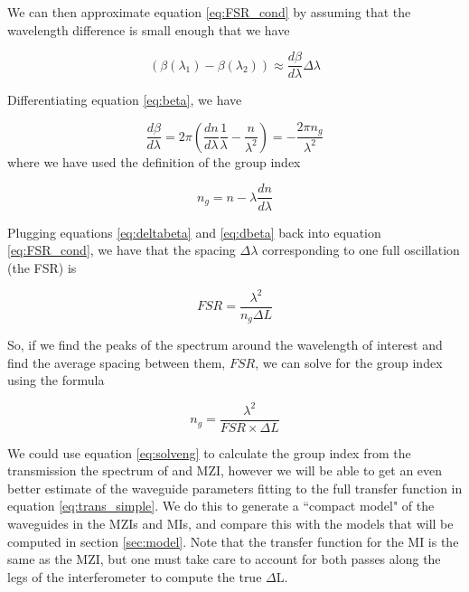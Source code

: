 \documentclass[journal]{IEEEtran}
\begin{document}
We can then approximate equation \ref{eq:FSR_cond} by assuming that the wavelength difference is small enough that we have

\begin{equation}
(\beta(\lambda_1) - \beta(\lambda_2)) \approx \frac{d\beta}{d\lambda} \Delta \lambda
\label{eq:deltabeta}
\end{equation}

Differentiating equation \ref{eq:beta}, we have

\begin{equation}
\frac{d\beta}{d\lambda} = 2\pi\left(\frac{dn}{d\lambda}\frac{1}{\lambda} - \frac{n}{\lambda^2} \right) = - \frac{2\pi  n_g}{\lambda^2}
\label{eq:dbeta}
\end{equation}
where we have used the definition of the group index 

\begin{equation}
n_g = n - \lambda \frac{dn}{d \lambda}
\label{eq:ngdef}
\end{equation}


Plugging equations \ref{eq:deltabeta} and  \ref{eq:dbeta} back into equation \ref{eq:FSR_cond}, we have that the spacing $\Delta \lambda$ corresponding to one full oscillation (the FSR) is 

\begin{equation}
FSR = \frac{\lambda^2}{n_g \Delta L}
\label{eq:FSR}
\end{equation}

So, if we find the peaks of the spectrum around the wavelength of interest and find the average spacing between them, $FSR$, we can solve for the group index using the formula

\begin{equation}
n_g = \frac{\lambda^2}{FSR \times \Delta L}
\label{eq:solveng}
\end{equation}

We could use equation \ref{eq:solveng} to calculate the group index from the transmission the spectrum of and MZI, however we will be able to get an even better estimate of the waveguide parameters fitting to the full transfer function in equation \ref{eq:trans_simple}. We do this to generate a ``compact model" of the waveguides in the MZIs and MIs, and compare this with the models that will be computed in section \ref{sec:model}. Note that the transfer function for the MI is the same as the MZI, but one must take care to account for both passes along the legs of the interferometer to compute the true $\Delta$L.
\end{document}
